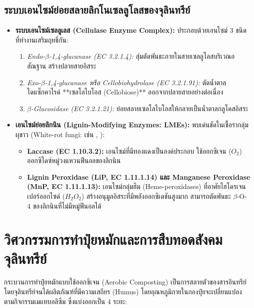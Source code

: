 \subsection{ระบบเอนไซม์ย่อยสลายลิกโนเซลลูโลสของจุลินทรีย์}
\begin{itemize}
    \item \textbf{ระบบเอนไซม์เซลลูเลส (Cellulase Enzyme Complex):} ประกอบด้วยเอนไซม์ 3 ชนิดที่ทำงานเสริมฤทธิ์กัน:
    \begin{enumerate}
        \item \textit{Endo-$\beta$-1,4-glucanase (EC 3.2.1.4):} สุ่มตัดพันธะภายในสายเซลลูโลสบริเวณอสัณฐาน สร้างปลายสายอิสระ
        \item \textit{Exo-$\beta$-1,4-glucanase หรือ Cellobiohydrolase (EC 3.2.1.91):} ตัดน้ำตาลไดแซ็กคาไรด์ **เซลโลไบโอส (Cellobiose)** ออกจากปลายสายอย่างต่อเนื่อง
        \item \textit{$\beta$-Glucosidase (EC 3.2.1.21):} ย่อยสลายเซลโลไบโอสให้กลายเป็นน้ำตาลกลูโคสอิสระ
    \end{enumerate}
    \item \textbf{เอนไซม์ย่อยลิกนิน (Lignin-Modifying Enzymes: LMEs):} พบเด่นชัดในเชื้อรากลุ่มผุขาว (White-rot fungi: เช่น , ):
    \begin{itemize}
        \item \textbf{Laccase (EC 1.10.3.2):} เอนไซม์ที่มีทองแดงเป็นองค์ประกอบ ใช้ออกซิเจน ($O_2$) ออกซิไดซ์หมู่วงแหวนฟีนอลของลิกนิน
        \item \textbf{Lignin Peroxidase (LiP, EC 1.11.1.14) และ Manganese Peroxidase (MnP, EC 1.11.1.13):} เอนไซม์กลุ่มฮีม (Heme-peroxidases) ที่อาศัยไฮโดรเจนเปอร์ออกไซด์ ($H_2O_2$) สร้างอนุมูลอิสระที่มีพลังออกซิเดชันสูงมาก สามารถตัดพันธะ $\beta$-O-4 ของลิกนินที่ไม่มีหมู่ฟีนอลได้
    \end{itemize}
\end{itemize}

\section{วิศวกรรมการทำปุ๋ยหมักและการสืบทอดสังคมจุลินทรีย์}

กระบวนการทำปุ๋ยหมักแบบใช้ออกซิเจน (Aerobic Composting) เป็นการสลายตัวของสารอินทรีย์โดยจุลินทรีย์จนได้ผลิตภัณฑ์ที่มีความเสถียร (Humus) โดยอุณหภูมิภายในกองปุ๋ยจะเปลี่ยนแปลงตามกิจกรรมเมแทบอลิซึม ซึ่งแบ่งออกเป็น 4 ระยะ:

